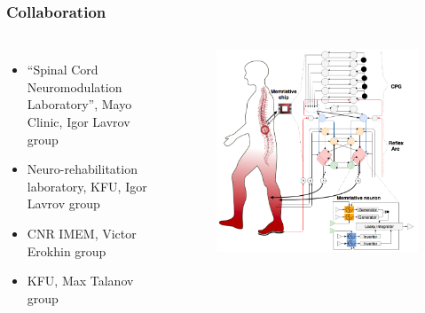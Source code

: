 \documentclass[12pt, aspectratio=169]{beamer}
\begin{document}
\begin{frame}
  \frametitle{Collaboration}
\begin{columns}[c]

\begin{itemize}
\item ``Spinal Cord Neuromodulation Laboratory'', Mayo Clinic, Igor Lavrov group
\item Neuro-rehabilitation laboratory, KFU, Igor Lavrov group
\item CNR IMEM, Victor Erokhin group
\item KFU, Max Talanov group 
\end{itemize}

\begin{figure}
\includegraphics[width=1.0\linewidth]{MemArc_logo}
\end{figure}
\end{columns}
\end{frame}

\end{document}
